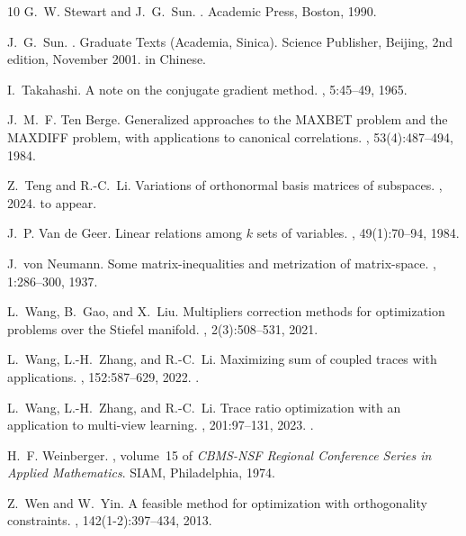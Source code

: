 \documentclass[11pt]{article}
\theoremstyle{definition}
\numberwithin{equation}{section}
\begin{document}
{\begin{thebibliography}{10}
G.~W. Stewart and J.~G.~Sun.
.
\newblock Academic Press, Boston, 1990.

J.~G.~Sun.
.
\newblock Graduate Texts (Academia, Sinica). Science Publisher, Beijing, 2nd
  edition, November 2001.
\newblock in Chinese.

I.~Takahashi.
\newblock A note on the conjugate gradient method.
, 5:45--49, 1965.

J.~M.~F. {Ten Berge}.
\newblock Generalized approaches to the {MAXBET} problem and the {MAXDIFF}
  problem, with applications to canonical correlations.
, 53(4):487--494, 1984.

Z.~Teng and R.-C.~Li.
\newblock Variations of orthonormal basis matrices of subspaces.
, 2024.
\newblock to appear.

J.~P. {Van de Geer}.
\newblock Linear relations among $k$ sets of variables.
, 49(1):70--94, 1984.

J.~von Neumann.
\newblock Some matrix-inequalities and metrization of matrix-space.
, 1:286--300, 1937.

L.~Wang, B.~Gao, and X.~Liu.
\newblock Multipliers correction methods for optimization problems over the
  {S}tiefel manifold.
, 2(3):508--531, 2021.

L.~Wang, L.-H.~Zhang, and R.-C.~Li.
\newblock Maximizing sum of coupled traces with applications.
, 152:587--629, 2022.
.

L.~Wang, L.-H.~Zhang, and R.-C.~Li.
\newblock Trace ratio optimization with an application to multi-view learning.
, 201:97--131, 2023.
.

H.~F. Weinberger.
, volume~15 of
  {\em CBMS-NSF Regional Conference Series in Applied Mathematics}.
\newblock SIAM, Philadelphia, 1974.

Z.~Wen and W.~Yin.
\newblock A feasible method for optimization with orthogonality constraints.
, 142(1-2):397--434, 2013.


\end{thebibliography}}
\end{document}
